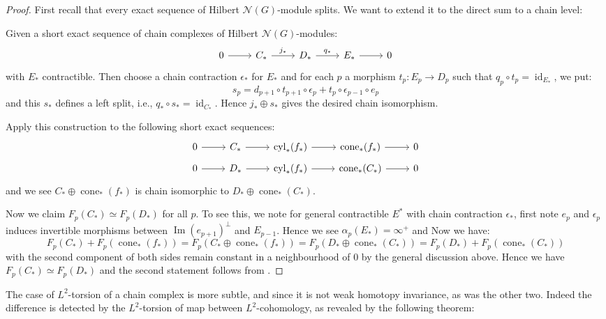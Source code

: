 \documentclass[11pt]{report}
\theoremstyle{definition}
\theoremstyle{plain}
\DeclareMathOperator{\id}{id}
\DeclareMathOperator{\im}{Im}
\DeclareMathOperator{\cone}{cone}
\DeclareMathOperator{\cyl}{cyl}
\newcommand{\vna}{\mathcal{N}}
\begin{document}
\begin{proof}
First recall  that every exact sequence of Hilbert $\vna(G)$-module splits. We want to extend it to the direct sum to a chain level:
	\par Given a short exact sequence of chain complexes of Hilbert $\vna(G)$-modules:
	\begin{equation}
	\begin{tikzcd}
	0\rar &C_*\rar{j_*} &D_* \rar{q_*} &E_* \rar &0
	\end{tikzcd}
	\end{equation}
	with $E_*$ contractible. Then choose a chain contraction $\epsilon_*$ for $E_*$ and for each $p$ a morphism $t_p:E_p\to D_p$ such that $q_p\circ t_p=\id_{E_*}$, we put:
	\begin{equation*}
	s_p=d_{p+1}\circ t_{p+1}\circ \epsilon_p+t_p\circ \epsilon_{p-1}\circ e_p
	\end{equation*}
	and this $s_*$ defines a left split, i.e., $q_*\circ s_*=\id_{C_*}$.  Hence $j_*\oplus s_*$ gives the desired chain isomorphism. 
	\par Apply this construction to the following short exact sequences:
	\begin{equation*}
	\begin{tikzcd}[row sep=tiny]
	0\rar &C_*\rar &\cyl_*(f_*) \rar &\cone_*(f_*) \rar &0\\
	0\rar &D_*\rar &\cyl_*(f_*) \rar &\cone_*(C_*) \rar &0
	\end{tikzcd}
	\end{equation*}
	and we see $C_*\oplus \cone_*(f_*)$ is chain isomorphic to $D_*\oplus \cone_*(C_*)$. 
	\par Now we claim $F_p(C_*)\simeq F_p(D_*)$ for all $p$. To see this, we note for general contractible $E^*$ with chain contraction $\epsilon_*$, first note $e_p$ and $\epsilon_p$ induces invertible morphisms between $\im(e_{p+1})^\perp$ and $E_{p-1}$. Hence we see $\alpha_p(E_*)=\infty^+$ and Now we have:
	\begin{equation*}
	F_p(C_*)+F_p(\cone_*(f_*))=F_p(C_*\oplus \cone_*(f_*))=F_p(D_*\oplus \cone_*(C_*))=F_p(D_*)+ F_p(\cone_*(C_*))
	\end{equation*}
	with the second component of both sides remain constant in a neighbourhood of $0$ by the general discussion above. Hence we have $F_p(C_*)\simeq F_p(D_*)$ and the second statement follows from .
\end{proof}
The case of $L^2$-torsion of a chain complex is more subtle, and since it is not weak homotopy invariance, as was the other two. Indeed the difference is detected by the $L^2$-torsion of map between $L^2$-cohomology, as revealed by the following theorem:
\end{document}
